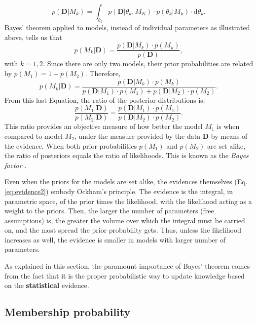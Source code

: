 \begin{equation}
p(\mathbf{D}|M_k)=\int_{\theta_k} p(\mathbf{D}|\theta_k,M_K)\cdot p(\theta_k|M_k)\cdot \mathrm{d}\theta_k. \label{eq:evidence2}
\end{equation}
Bayes' theorem applied to models, instead of individual parameters as illustrated above, tells us that
\begin{equation}
p(M_k|\mathbf{D})=\frac{p(\mathbf{D}|M_k)\cdot p(M_k)}{p(\mathbf{D})},
\end{equation}
with $k=1,2$. Since there are only two models, their prior probabilities are related by $p(M_1)= 1- p(M_2)$. Therefore,
 \begin{equation}
p(M_k|\mathbf{D})=\frac{p(\mathbf{D}|M_k)\cdot p(M_k)}{p(\mathbf{D}|M_1)\cdot p(M_1)+p(\mathbf{D}|M_2)\cdot p(M_2)}.
\end{equation}
From this last Equation, the ratio of the posterior distributions is:
\begin{equation}
\label{eq:modelselection}
\frac{p(M_1|\mathbf{D})}{p(M_2|\mathbf{D})}=\frac{p(\mathbf{D}|M_1)\cdot p(M_1)}{p(\mathbf{D}|M_2)\cdot p(M_2)}.
\end{equation}
This ratio provides an objective measure of how better the model $M_1$ is when compared to model $M_2$, under the measure provided by the data $\mathbf{D}$ by means of the evidence. When both prior probabilities  $p(M_1)$ and $p(M_2)$ are set alike, the ratio of posteriors equals the ratio of likelihoods. This is known as the \emph{Bayes factor} \cite[for a similar derivation and some examples of its application see][]{Kaas1995}. 

Even when the priors for the models are set alike, the evidences themselves (Eq. \ref{eq:evidence2}) embody Ockham's principle. The evidence is the integral, in parametric space, of the prior times the likelihood, with the likelihood acting as a weight to the priors.  Then, the larger the number of parameters (free assumptions) is, the greater the volume over which the integral must be carried on, and the most spread the prior probability gets. Thus, unless the likelihood increases as well, the evidence is smaller in models with larger number of parameters.

As explained in this section, the paramount importance of Bayes' theorem comes from the fact that it is the proper probabilistic way to update knowledge based on the \textbf{statistical} evidence.

\subsection{Membership probability}

